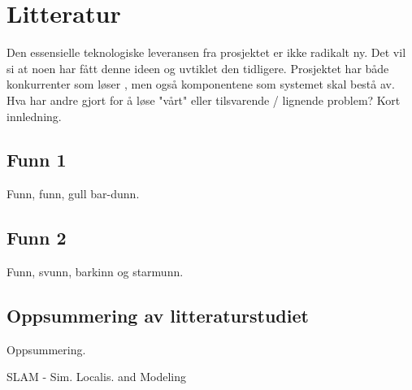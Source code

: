 
\chapter{Litteratur} %

\label{ch:litteratur} %


Den essensielle teknologiske leveransen fra prosjektet er ikke radikalt ny. Det vil si at noen har fått denne ideen og uvtiklet den tidligere. Prosjektet har både konkurrenter som løser  , men også komponentene som systemet skal bestå av. 
\\
Hva har andre gjort for å løse "vårt" eller tilsvarende / lignende problem? Kort innledning.
\section{Funn 1}
Funn, funn, gull bar-dunn.
\section{Funn 2}
Funn, svunn, barkinn og starmunn. 
\section{Oppsummering av litteraturstudiet}
Oppsummering.

SLAM - Sim. Localis. and Modeling